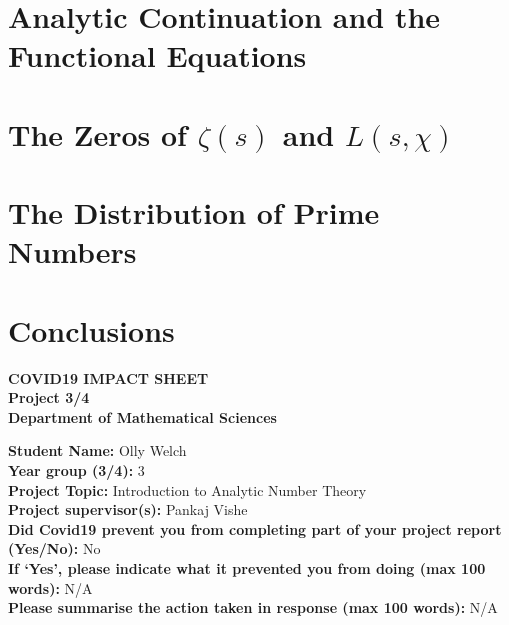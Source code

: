 \documentclass[11pt]{report} %
\numberwithin{equation}{chapter}
\theoremstyle{definition}
\theoremstyle{remark}
\begin{document}
\chapter{Analytic Continuation and the Functional Equations}




\chapter{The Zeros of \texorpdfstring{$\zeta(s)$}{Lg} and \texorpdfstring{$L(s, \chi)$}{Lg}}







\chapter{The Distribution of Prime Numbers}





\chapter{Conclusions}


\begin{appendices}

\renewcommand{\thesection}{\arabic{section}}
\renewcommand{\theequation}{A\arabic{equation}}
\renewcommand{\thetheorem}{A\arabic{theorem}}






\end{appendices}




\clearpage
\begin{center}\bfseries\Large  COVID19 IMPACT SHEET\\Project 3/4\\Department of Mathematical Sciences\end{center}\vspace{1em}
\noindent\textbf{Student Name:}  Olly Welch \\[1em]
\noindent\textbf{Year group (3/4):}  3 \\[1em]
\noindent\textbf{Project Topic:}  Introduction to Analytic Number Theory \\[1em]
\noindent\textbf{Project supervisor(s):}  Pankaj Vishe \\[1em]
\noindent\textbf{Did Covid19 prevent you from completing part of your project report (Yes/No):} No \\[1em]
\noindent\textbf{If `Yes', please indicate what it prevented you from doing (max 100 words):} N/A \\[1em]
\noindent\textbf{Please summarise the action taken in response (max 100 words):} N/A
\end{document}
